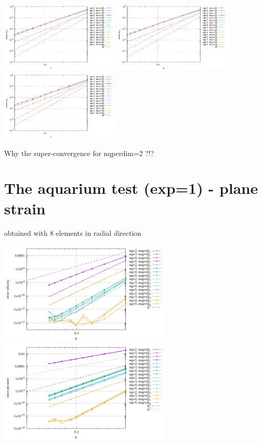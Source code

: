 \begin{center}
\includegraphics[width=5.7cm]{python_codes/fieldstone_152/results/exp0/err_exx3}
\includegraphics[width=5.7cm]{python_codes/fieldstone_152/results/exp0/err_eyy3}
\includegraphics[width=5.7cm]{python_codes/fieldstone_152/results/exp0/err_exy3}
\end{center}

Why the super-convergence for nqperdim=2 ?!?



\newpage
\section*{The aquarium test (exp=1) - plane strain}

obtained with 8 elements in radial direction

\begin{center}
\includegraphics[width=8.3cm]{python_codes/fieldstone_152/results/exp1/errv}
\includegraphics[width=8.3cm]{python_codes/fieldstone_152/results/exp1/errp}
\end{center}

